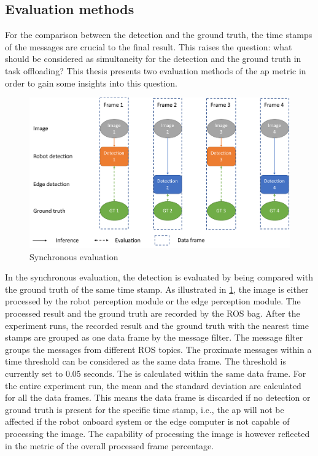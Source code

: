 \subsection{Evaluation methods}

For the comparison between the detection and the ground truth, the time stamps of the messages are crucial to the final result. This raises the question: what should be considered as simultaneity for the detection and the ground truth in task offloading? This thesis presents two evaluation methods of the \gls{ap} metric in order to gain some insights into this question. 

\begin{figure}[htp]
    \centering
    \includegraphics[width=\linewidth]{figures/setup/sync_eval.pdf}
    \caption{Synchronous evaluation}
    \label{fig:sync_eval}
\end{figure}

In the synchronous evaluation, the detection is evaluated by being compared with the ground truth of the same time stamp. As illustrated in \cref{fig:sync_eval}, the image is either processed by the robot perception module or the edge perception module. The processed result and the ground truth are recorded by the ROS bag. After the experiment runs, the recorded result and the ground truth with the nearest time stamps are grouped as one data frame by the message filter. The message filter groups the messages from different ROS topics. The proximate messages within a time threshold can be considered as the same data frame. The threshold is currently set to 0.05 seconds. The is calculated within the same data frame. For the entire experiment run, the mean and the standard deviation are calculated for all the data frames. This means the data frame is discarded if no detection or ground truth is present for the specific time stamp, i.e., the \gls{ap} will not be affected if the robot onboard system or the edge computer is not capable of processing the image. The capability of processing the image is however reflected in the metric of the overall processed frame percentage. 

